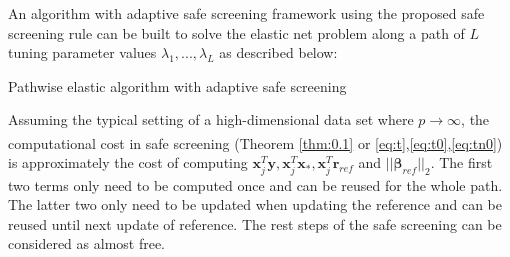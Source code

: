 An algorithm with adaptive safe screening framework \citep{wang2021adaptive} using the proposed safe screening rule can be built to solve the elastic net problem along a path of $L$ tuning parameter values $\lambda_1,...,\lambda_L$ as described below:

\begin{algorithm}[H]
  \label{alg:path}
    \SetAlgoLined
    \BlankLine
    
    \caption{Pathwise elastic algorithm with adaptive safe screening}
\end{algorithm}

Assuming the typical setting of a high-dimensional data set where $p\xrightarrow[]{}\infty$, the computational cost in safe screening (Theorem \ref{thm:0.1} or \eqref{eq:t},\eqref{eq:t0},\eqref{eq:tn0}) is approximately the cost of computing $\boldsymbol x_j^T\boldsymbol y,\boldsymbol x_j^T\boldsymbol x_*,\boldsymbol x_j^T\boldsymbol r_{ref}$ and $||\boldsymbol\beta_{ref}||_2$. The first two terms only need to be computed once and can be reused for the whole path. The latter two only need to be updated when updating the reference and can be reused until next update of reference. The rest steps of the safe screening can be considered as almost free.

